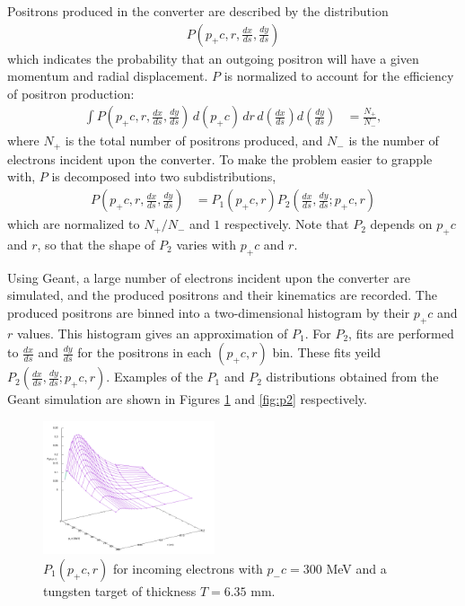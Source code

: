 \documentclass[letter,
               biblatex,     %
               keeplastbox,   %
               ]{jacow}
\newcommand{\dxds}{\frac{dx}{ds}}
\newcommand{\dyds}{\frac{dy}{ds}}
\begin{document}
Positrons produced in the converter are described by the distribution
\begin{align}
P \left( p_+ c, r, \dxds, \dyds \right)
\end{align}
which indicates the probability that an outgoing positron will have a given momentum and radial displacement.
$P$ is normalized to account for the efficiency of positron production:
\begin{align}
\int P \left( p_+ c, r, \dxds, \dyds \right) \, d(p_+ c) \, dr \, d \! \left( \dxds \right) d \! \left( \dyds \right) & = \frac{N_+}{N_-},
\end{align}
where $N_+$ is the total number of positrons produced, and $N_-$ is the number of electrons incident upon the converter.
To make the problem easier to grapple with, $P$ is decomposed into two subdistributions,
\begin{align}
P \left( p_+ c, r, \dxds, \dyds \right) & = P_1 \left( p_+ c, r \right) P_2 \left( \dxds, \dyds ; p_+ c, r \right)
\end{align}
which are normalized to $N_+/N_-$ and $1$ respectively.
Note that $P_2$ depends on $p_+ c$ and $r$, so that the shape of $P_2$ varies with $p_+ c$ and $r$.

Using Geant\cite{geant}, a large number of electrons incident upon the converter are simulated, and the produced positrons and their kinematics are recorded.
The produced positrons are binned into a two-dimensional histogram by their $p_+ c$ and $r$ values.
This histogram gives an approximation of $P_1$.
For $P_2$, fits are performed to $\dxds$ and $\dyds$ for the positrons in each $(p_+c, r)$ bin.
These fits yeild $P_2 \left( \dxds, \dyds ; p_+ c, r \right)$.
Examples of the $P_1$ and $P_2$ distributions obtained from the Geant simulation are shown in Figures \ref{fig:p1} and \ref{fig:p2} respectively.

\begin{figure}
\centering
\includegraphics[width=0.45\textwidth]{p1}
\caption{$P_1(p_+ c, r)$ for incoming electrons with $p_- c = 300$ MeV and a tungsten target of thickness $T = 6.35$ mm.}
\label{fig:p1}
\end{figure}
\end{document}
